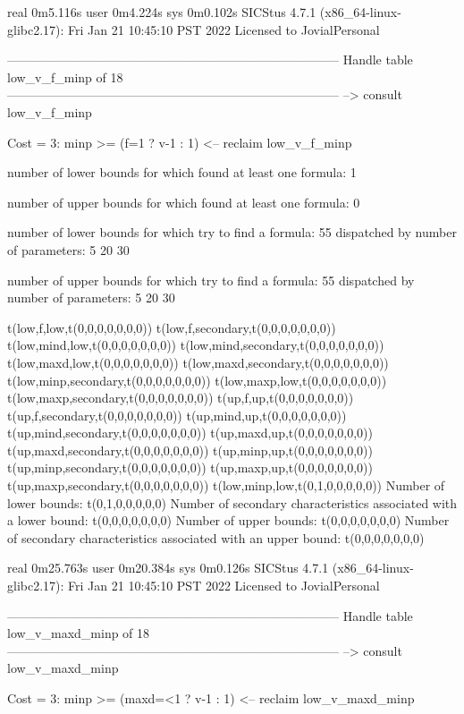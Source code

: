 real	0m5.116s
user	0m4.224s
sys	0m0.102s
SICStus 4.7.1 (x86_64-linux-glibc2.17): Fri Jan 21 10:45:10 PST 2022
Licensed to JovialPersonal


--------------------------------------------------------------------------------
Handle table low_v_f_minp of 18
--------------------------------------------------------------------------------
--> consult low_v_f_minp

Cost =  3:  minp >= (f=1 ? v-1 : 1)
<-- reclaim low_v_f_minp

number of lower bounds for which found at least one formula: 1

number of upper bounds for which found at least one formula: 0

number of lower bounds for which try to find a formula: 55
dispatched by number of parameters: 5  20  30

number of upper bounds for which try to find a formula: 55
dispatched by number of parameters: 5  20  30

t(low,f,low,t(0,0,0,0,0,0,0))
t(low,f,secondary,t(0,0,0,0,0,0,0))
t(low,mind,low,t(0,0,0,0,0,0,0))
t(low,mind,secondary,t(0,0,0,0,0,0,0))
t(low,maxd,low,t(0,0,0,0,0,0,0))
t(low,maxd,secondary,t(0,0,0,0,0,0,0))
t(low,minp,secondary,t(0,0,0,0,0,0,0))
t(low,maxp,low,t(0,0,0,0,0,0,0))
t(low,maxp,secondary,t(0,0,0,0,0,0,0))
t(up,f,up,t(0,0,0,0,0,0,0))
t(up,f,secondary,t(0,0,0,0,0,0,0))
t(up,mind,up,t(0,0,0,0,0,0,0))
t(up,mind,secondary,t(0,0,0,0,0,0,0))
t(up,maxd,up,t(0,0,0,0,0,0,0))
t(up,maxd,secondary,t(0,0,0,0,0,0,0))
t(up,minp,up,t(0,0,0,0,0,0,0))
t(up,minp,secondary,t(0,0,0,0,0,0,0))
t(up,maxp,up,t(0,0,0,0,0,0,0))
t(up,maxp,secondary,t(0,0,0,0,0,0,0))
t(low,minp,low,t(0,1,0,0,0,0,0))
Number of lower bounds:                                             t(0,1,0,0,0,0,0)
Number of secondary characteristics associated with a lower bound:  t(0,0,0,0,0,0,0)
Number of upper bounds:                                             t(0,0,0,0,0,0,0)
Number of secondary characteristics associated with an upper bound: t(0,0,0,0,0,0,0)

real	0m25.763s
user	0m20.384s
sys	0m0.126s
SICStus 4.7.1 (x86_64-linux-glibc2.17): Fri Jan 21 10:45:10 PST 2022
Licensed to JovialPersonal


--------------------------------------------------------------------------------
Handle table low_v_maxd_minp of 18
--------------------------------------------------------------------------------
--> consult low_v_maxd_minp

Cost =  3:  minp >= (maxd=<1 ? v-1 : 1)
<-- reclaim low_v_maxd_minp


